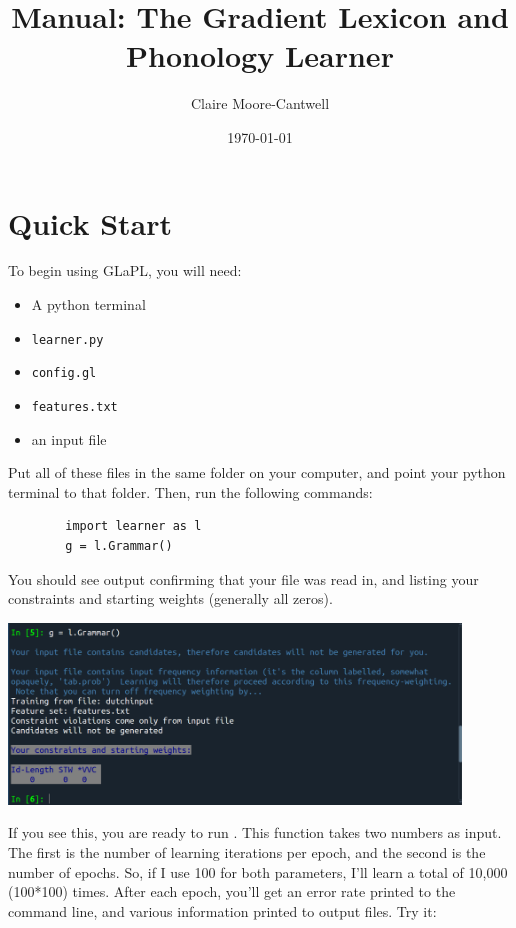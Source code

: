\documentclass[12]{article}
\title{Manual: The Gradient Lexicon and Phonology Learner}
\author{Claire Moore-Cantwell}
\date{\today}
\begin{document}
\maketitle

\section{Quick Start}

To begin using GLaPL, you will need:
\begin{itemize}
\item A python terminal
\item \texttt{learner.py}
\item \texttt{config.gl}
\item \texttt{features.txt}
\item an input file
\end{itemize}

Put all of these files in the same folder on your computer, and point your python terminal to that folder.  Then, run the following commands:

	\begin{verbatim}
		import learner as l
		g = l.Grammar()
	\end{verbatim}

You should see output confirming that your file was read in, and listing your constraints and starting weights (generally all zeros).  

\includegraphics[width=0.9\textwidth]{embeddedImages/grammarCreationOutput.pdf}

If you see this, you are ready to run .  This function takes two numbers as input.  The first is the number of learning iterations per epoch, and the second is the number of epochs.  So, if I use 100 for both parameters, I'll learn a total of 10,000 (100*100) times.  After each epoch, you'll get an error rate printed to the command line, and various information printed to output files.  Try it:
\end{document}
